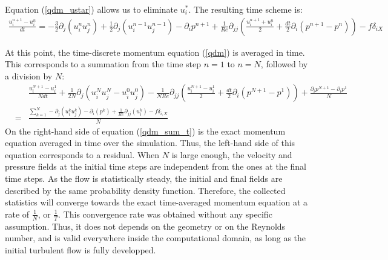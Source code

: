 \documentclass[aip,pof,reprint]{revtex4-1}
\begin{document}
\begin{widetext}
Equation (\ref{qdm_ustar}) allows us to eliminate $u_i^*$.
The resulting time scheme is:
\begin{eqnarray}
\label{qdm}
\frac{u_i^{n+1}-u_i^n}{dt}
=
- \frac{3}{2} \partial_j \left( u_i^n u_j^n \right)
+ \frac{1}{2} \partial_j \left( u_i^{n-1} u_j^{n-1} \right)
- \partial_i p^{n+1} %
+ \frac{1}{Re} \partial_{jj} \left( \frac{u_i^{n+1} + u_i^n}{2} + \frac{dt}{2} \partial_i \left( p^{n+1}-p^{n} \right) \right)
- f \delta_{iX}
\end{eqnarray}

At this point, the time-discrete momentum equation (\ref{qdm}) is averaged in time.
This corresponds to a summation from the time step $n=1$ to $n=N$, followed by a division by $N$:
\begin{eqnarray}
\label{qdm_sum_t}
&&
\frac{u_i^{N+1}-u_i^1}{Ndt}
+ \frac{1}{2N} \partial_j \left( u_i^{N} u_j^{N} - u_i^0 u_j^0 \right)
- \frac{1}{NRe} \partial_{jj} \left( \frac{u_i^{N+1} - u_i^1}{2} + \frac{dt}{2} \partial_i \left( p^{N+1} - p^1 \right) \right)
+ \frac{\partial_i p^{N+1} - \partial_i p^1}{N}
\nonumber \\
& = &
\frac{ \sum_{k=1}^N
- \partial_j \left( u_i^k u_j^k \right)
- \partial_i \left( p^k \right)
+ \frac{1}{Re} \partial_{jj} \left( u_i^k \right)
- f \delta_{i,X}}{N}
\end{eqnarray}
On the right-hand side of equation (\ref{qdm_sum_t}) is the exact momentum equation averaged in time over the simulation.
Thus, the left-hand side of this equation corresponds to a residual.
When $N$ is large enough, the velocity and pressure fields at the initial time steps are independent from the ones at the final time steps.
As the flow is statistically steady, the initial and final fields are described by the same probability density function.
Therefore, the collected statistics will converge towards the exact time-averaged momentum equation at a rate of $\frac{1}{N}$, or $\frac{1}{T}$.
This convergence rate was obtained without any specific assumption.
Thus, it does not depends on the geometry or on the Reynolds number, and is valid everywhere inside the computational domain, as long as the initial turbulent flow is fully developped.


\end{widetext}
\end{document}
